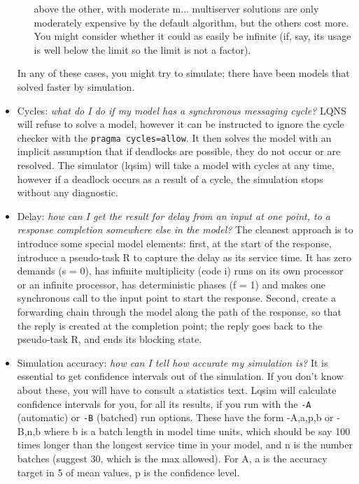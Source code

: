 \documentclass[11pt]{article}
\begin{document}
\begin{itemize}
\begin{enumerate}
  above the other, with moderate m... multiserver solutions are only
  moderately expensive by the default algorithm, but the others cost
  more. You might consider whether it could as easily be infinite (if,
  say, its usage is well below the limit so the limit is not a
  factor). 
  \end{enumerate}
  In any of these cases, you might try to simulate; there
  have been models that solved faster by simulation.
\item Cycles: \emph{what do I do if my model has a synchronous
    messaging cycle?} LQNS will refuse to solve a model, however it
  can be instructed to ignore the cycle checker with the
  \texttt{pragma~cycles=allow}. It then solves the model with an
  implicit assumption that if deadlocks are possible, they do not
  occur or are resolved.  The simulator (lqsim) will take a model
  with cycles at any time, however if a deadlock occurs as a result of
  a cycle, the simulation stops without any diagnostic.
\item Delay: \emph{how can I get the result for delay from an input at
    one point, to a response completion somewhere else in the model?}
  The cleanest approach is to introduce some special model elements:
  first, at the start of the response, introduce a pseudo-task R to
  capture the delay as its service time. It has zero demands (s = 0),
  has infinite multiplicity (code i) runs on its own processor or an
  infinite processor, has deterministic phases (f = 1) and makes one
  synchronous call to the input point to start the response. Second,
  create a forwarding chain through the model along the path of the
  response, so that the reply is created at the completion point; the
  reply goes back to the pseudo-task R, and ends its blocking state.
\item Simulation accuracy: \emph{how can I tell how accurate my
    simulation is?} It is essential to get confidence
  intervals out of
  the simulation. If you don't know about these, you will have to
  consult a statistics text. Lqsim will calculate confidence
  intervals for you, for all its results, if you run with the
  \texttt{-A} (automatic) or \texttt{-B} (batched) run options. These
  have the form -A,a,p,b or -B,n,b where b is a batch length in model
  time units, which should be say 100 times longer than the longest
  service time in your model, and n is the number batches (suggest 30,
  which is the max allowed). For A, a is the accuracy target in 5 of
  mean values, p is the confidence level.
\end{itemize}
\clearpage
\end{document}
